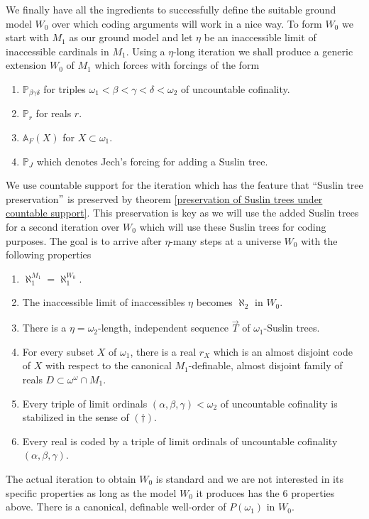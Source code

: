 \documentclass[a4paper,11pt]{article}
\newcommand{\forceP}{\mathbb{P}}
\begin{document}
We finally have all the ingredients to successfully define the suitable ground model $W_0$ over which coding arguments will work in a nice way.
To form $W_0$ we start with $M_1$ as our ground model and let $\eta$ be an inaccessible limit of inaccessible cardinals in $M_1$. Using a $\eta$-long iteration we shall produce a generic extension $W_0$ of $M_1$ which forces with forcings of the form
\begin{enumerate}
\item $\forceP_{\beta \gamma \delta}$  for triples $\omega_1 < \beta < \gamma < \delta <\omega_2$ of uncountable cofinality.
\item $\forceP_r$ for reals $r$.
\item $\mathbb{A}_F (X)$ for $X \subset \omega_1$.
\item $\forceP_J$  which denotes Jech's forcing for adding a Suslin tree.

\end{enumerate}
We use countable support for the iteration which has the feature that ``Suslin tree preservation$"$ is preserved by theorem \ref{preservation of Suslin trees under countable support}. This preservation is key as we will use the added Suslin trees for a second iteration over $W_0$ which will use these Suslin trees for coding purposes. The goal is to arrive after $\eta$-many steps at a universe $W_0$ with the following properties
\begin{enumerate}
\item $\aleph_1^{M_1} = \aleph_1^{W_0}$.
\item The inaccessible limit of inaccessibles $\eta$ becomes $\aleph_2$ in $W_0$.

\item There is a $\eta=\omega_2$-length, independent sequence $\vec{T}$ of $\omega_1$-Suslin trees.
\item For every subset $X$ of $\omega_1$, there is a real $r_X$ which is an almost disjoint code of $X$ with respect to the canonical $M_1$-definable, almost disjoint family of reals $D \subset \omega^{\omega} \cap M_1$.
\item Every triple of limit ordinals $(\alpha, \beta, \gamma) < \omega_2$ of uncountable cofinality is stabilized in the sense of $(\dagger)$.
\item Every real is coded by a triple of limit ordinals of uncountable cofinality $(\alpha,\beta,\gamma)$.
\end{enumerate}

The actual iteration to obtain $W_0$ is standard and we are not interested in its specific properties as long as the model $W_0$ it produces has the 6 properties above. There is a canonical, definable well-order of $P(\omega_1)$ in $W_0$.
 
\end{document}

